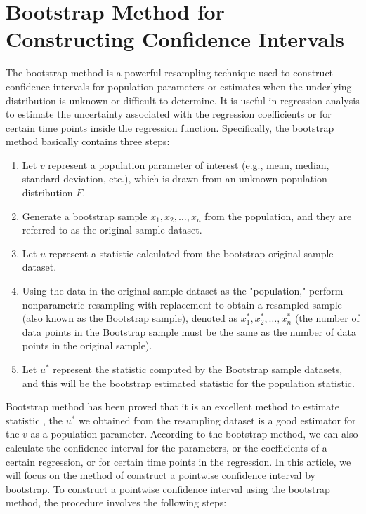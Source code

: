 \documentclass[12pt]{article}
\begin{document}
\section{Bootstrap Method for Constructing Confidence Intervals}
\label{Bootstrap Method for Constructing Confidence Intervals}

The bootstrap method is a powerful resampling technique used to construct 
confidence intervals for population parameters or estimates when the underlying 
distribution is unknown or difficult to determine. \cite{hall2013simple}It is 
useful in regression analysis to estimate the uncertainty associated with the 
regression coefficients or for certain time points inside the regression 
function. Specifically, the bootstrap method basically contains three steps:

\begin{enumerate}[label=\arabic*.]
    \item Let \(v\) represent a population parameter of interest (e.g., mean,
    median, standard deviation, etc.), which is drawn from an unknown population
    distribution \(F\).
    \item Generate a bootstrap sample \(x_1, x_2, \ldots, x_n\) from the 
    population, and they are referred to as the original sample dataset.
    \item Let \(u\) represent a statistic calculated from the bootstrap original
    sample dataset.
    \item Using the data in the original sample dataset as the "population," 
    perform nonparametric resampling with replacement to obtain a resampled sample
    (also known as the Bootstrap sample), denoted as \(x_1^*, x_2^*, \ldots, x_n^*\)
    (the number of data points in the Bootstrap sample must be the same as the 
    number of data points in the original sample).
    \item Let \(u^*\) represent the statistic computed by the Bootstrap 
    sample datasets, and this will be the bootstrap estimated statistic 
    for the population statistic.

\end{enumerate}

Bootstrap method has been proved that it is an excellent method to estimate 
statistic \cite{efron1979bootstrap}, the \(u^*\) we obtained from the resampling
dataset is a good estimator for the \(v\) as a population parameter. According 
to the bootstrap method, we can also calculate the confidence interval for the 
parameters, or the coefficients of a certain regression, or for certain time points
in the regression. In this article, we will focus on the method of construct a 
pointwise confidence interval by bootstrap. To construct a pointwise confidence 
interval using the bootstrap method, the procedure involves the following steps:
\end{document}
